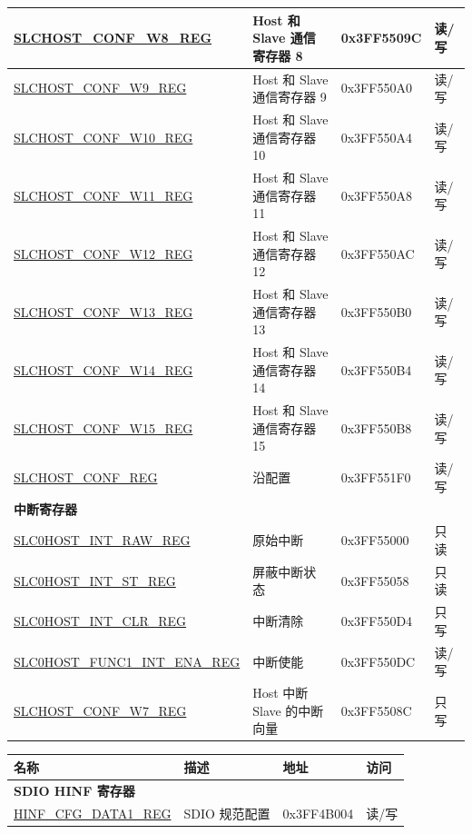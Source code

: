 \documentclass[sdio_slave.tex]{subfiles}
\begin{document}
\begin{longtable}{ | p{6cm} | p{7cm} | p{2cm} | p{1cm} | }
\hyperref[regdesc:SLCHOSTCONFW8REG]{SLCHOST\_CONF\_W8\_REG} & Host 和 Slave 通信寄存器 8& 0x3FF5509C & 读/写 \\ \hline
\hyperref[regdesc:SLCHOSTCONFW9REG]{SLCHOST\_CONF\_W9\_REG} & Host 和 Slave 通信寄存器 9& 0x3FF550A0 & 读/写 \\ \hline
\hyperref[regdesc:SLCHOSTCONFW10REG]{SLCHOST\_CONF\_W10\_REG} & Host 和 Slave 通信寄存器 10& 0x3FF550A4 & 读/写 \\ \hline
\hyperref[regdesc:SLCHOSTCONFW11REG]{SLCHOST\_CONF\_W11\_REG} &Host 和 Slave 通信寄存器 11 & 0x3FF550A8 & 读/写 \\ \hline
\hyperref[regdesc:SLCHOSTCONFW12REG]{SLCHOST\_CONF\_W12\_REG} &Host 和 Slave 通信寄存器 12 & 0x3FF550AC & 读/写 \\ \hline
\hyperref[regdesc:SLCHOSTCONFW13REG]{SLCHOST\_CONF\_W13\_REG} &Host 和 Slave 通信寄存器 13 & 0x3FF550B0 & 读/写 \\ \hline
\hyperref[regdesc:SLCHOSTCONFW14REG]{SLCHOST\_CONF\_W14\_REG} &Host 和 Slave 通信寄存器 14 & 0x3FF550B4 & 读/写 \\ \hline
\hyperref[regdesc:SLCHOSTCONFW15REG]{SLCHOST\_CONF\_W15\_REG} &Host 和 Slave 通信寄存器 15 & 0x3FF550B8 & 读/写 \\ \hline
\hyperref[regdesc:SLCHOSTCONFREG]{SLCHOST\_CONF\_REG} & 沿配置 & 0x3FF551F0 & 读/写 \\ \hline
\multicolumn{4}{|l|}{\textbf{中断寄存器}} \\ \hline
\hyperref[regdesc:SLC0HOSTINTRAWREG]{SLC0HOST\_INT\_RAW\_REG} & 原始中断 & 0x3FF55000 & 只读 \\ \hline
\hyperref[regdesc:SLC0HOSTINTSTREG]{SLC0HOST\_INT\_ST\_REG} & 屏蔽中断状态 & 0x3FF55058 & 只读 \\ \hline
\hyperref[regdesc:SLC0HOSTINTCLRREG]{SLC0HOST\_INT\_CLR\_REG} &中断清除 & 0x3FF550D4 & 只写 \\ \hline
\hyperref[regdesc:SLC0HOSTFUNC1INTENAREG]{SLC0HOST\_FUNC1\_INT\_ENA\_REG} & 中断使能& 0x3FF550DC & 读/写 \\ \hline
\hyperref[regdesc:SLCHOSTCONFW7REG]{SLCHOST\_CONF\_W7\_REG} & Host 中断 Slave 的中断向量& 0x3FF5508C & 只写 \\ \hline

\end{longtable}


\begin{longtable}{ | p{5cm} | p{7.5cm} | p{2cm} | p{1cm} | }
\hline\rowcolor{lightgray}
名称 & 描述 &  地址 & 访问 \\ \hline
\multicolumn{4}{|l|}{\textbf{SDIO HINF 寄存器}} \\ \hline
\hyperref[regdesc:HINFCFGDATA1REG]{HINF\_CFG\_DATA1\_REG} & SDIO 规范配置& 0x3FF4B004 & 读/写 \\ \hline
\end{longtable}
\end{document}
